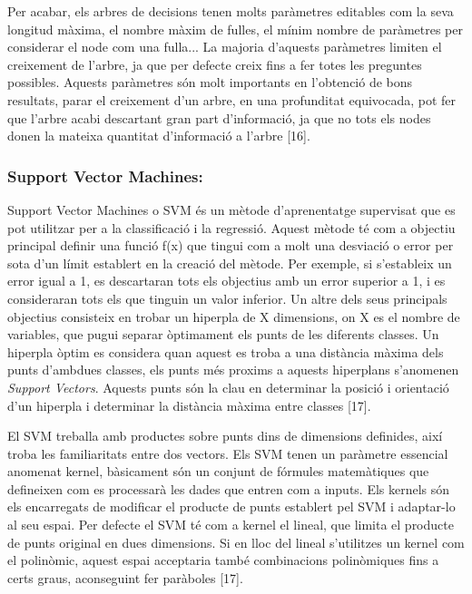 \documentclass[10pt,a4paper,twocolumn,twoside]{article}
\begin{document}
Per acabar, els arbres de decisions tenen molts paràmetres editables com la seva longitud màxima, el nombre màxim de fulles, el mínim nombre de paràmetres per considerar el node com una fulla... La majoria d'aquests paràmetres limiten el creixement de l'arbre, ja que per defecte creix fins a fer totes les preguntes possibles. Aquests paràmetres són molt importants en l'obtenció de bons resultats, parar el creixement d'un arbre, en una profunditat equivocada, pot fer que l'arbre acabi descartant gran part d'informació, ja que no tots els nodes donen la mateixa quantitat d'informació a l'arbre [16].
\subsubsection{Support Vector Machines:}
Support Vector Machines o SVM és un mètode d'aprenentatge supervisat que es pot utilitzar per a la classificació i la regressió. Aquest mètode té com a objectiu principal definir una funció f(x) que tingui com a molt una desviació o error per sota d'un límit establert en la creació del mètode. Per exemple, si s'estableix un error igual a 1, es descartaran tots els objectius amb un error superior a 1, i es consideraran tots els que tinguin un valor inferior. Un altre dels seus principals objectius consisteix en trobar un hiperpla de X dimensions, on X es el nombre de variables, que pugui separar òptimament els punts de les diferents classes. Un hiperpla òptim es considera quan aquest es troba a una distància màxima dels punts d'ambdues classes, els punts més proxims a aquests hiperplans s'anomenen \textit{Support Vectors}. Aquests punts són la clau en determinar la posició i orientació d'un hiperpla i determinar la distància màxima entre classes [17].

El SVM treballa amb productes sobre punts dins de dimensions definides, així troba les familiaritats entre dos vectors. Els SVM tenen un paràmetre essencial anomenat kernel, bàsicament són un conjunt de fórmules matemàtiques que defineixen com es processarà les dades que entren com a inputs. Els kernels són els encarregats de modificar el producte de punts establert pel SVM i adaptar-lo al seu espai. Per defecte el SVM té com a kernel el lineal, que limita el producte de punts original en dues dimensions. Si en lloc del lineal s'utilitzes un kernel com el polinòmic, aquest espai acceptaria també combinacions polinòmiques fins a certs graus, aconseguint fer paràboles [17]. 
\end{document}
